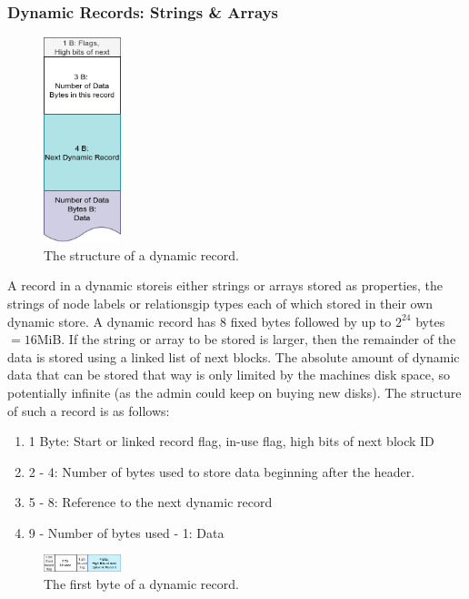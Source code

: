 \documentclass[a4paper,10pt]{article}
\begin{document}
    \subsubsection{Dynamic Records: Strings \& Arrays}\label{dynamic}
    \begin{figure}[htp]\label{dynamic_rec}
        \begin{center}
            \includegraphics[keepaspectratio,height=0.2\textheight,width=0.2\textwidth]{img/03_record/dynamic.png}
        \end{center}
        \caption{The structure of a dynamic record.} %
    \end{figure}
    A record in a dynamic storeis either strings or arrays stored as properties,  the strings of node labels or relationsgip types each of which stored in their own dynamic store. A dynamic record has 8 fixed bytes followed by up to $2^24$ bytes $= 16 $MiB. If the string or array to be stored is larger, then the remainder of the data is stored using a linked list of next blocks. The absolute amount of dynamic data that can be stored that way is only limited by the machines disk space, so potentially infinite (as the admin could keep on buying new disks). The structure of such a record is as follows:
    \begin{enumerate}
     \item 1 Byte: Start or linked record flag, in-use flag, high bits of next block ID
     \item 2 - 4: Number of bytes used to store data beginning after the header.
     \item 5 - 8: Reference to the next dynamic record
     \item 9 - Number of bytes used - 1: Data
    \end{enumerate}
    
    \begin{figure}[htp]\label{dynamic_first}
        \begin{center}
            \includegraphics[keepaspectratio,height=0.2\textheight,width=0.2\textwidth]{img/03_record/dynamic_first_byte.png}
        \end{center}
        \caption{The first byte of a dynamic record.} %
    \end{figure}
\end{document}
